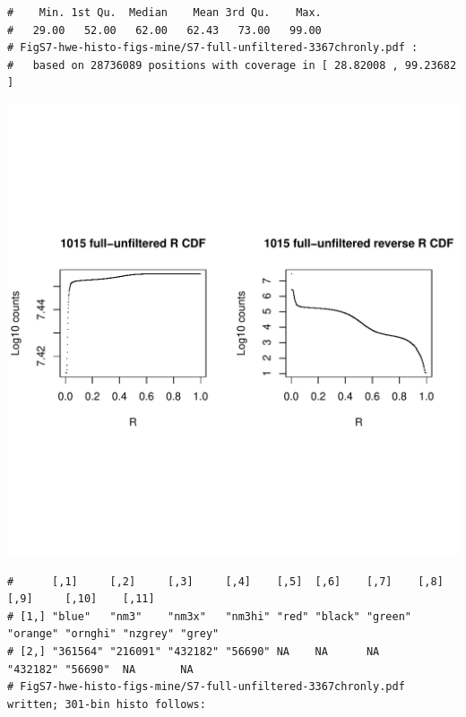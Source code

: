 \documentclass{article}\usepackage[]{graphicx}\usepackage[]{color}
\makeatletter
\def\maxwidth{ %
  \ifdim\Gin@nat@width>\linewidth
    \linewidth
  \else
    \Gin@nat@width
  \fi
}
\newenvironment{kframe}{%
 \def\at@end@of@kframe{}%
 \ifinner\ifhmode%
  \def\at@end@of@kframe{\end{minipage}}%
  \begin{minipage}{\columnwidth}%
 \fi\fi%
 \def\FrameCommand##1{\hskip\@totalleftmargin \hskip-\fboxsep
 \colorbox{shadecolor}{##1}\hskip-\fboxsep
     \hskip-\linewidth \hskip-\@totalleftmargin \hskip\columnwidth}%
 \MakeFramed {\advance\hsize-\width
   \@totalleftmargin\z@ \linewidth\hsize
   \@setminipage}}%
 {\par\unskip\endMakeFramed%
 \at@end@of@kframe}
\newenvironment{knitrout}{}{} %
\makeatother
\begin{document}
\begin{knitrout}
\begin{kframe}
\begin{verbatim}
#    Min. 1st Qu.  Median    Mean 3rd Qu.    Max. 
#   29.00   52.00   62.00   62.43   73.00   99.00 
# FigS7-hwe-histo-figs-mine/S7-full-unfiltered-3367chronly.pdf :
#   based on 28736089 positions with coverage in [ 28.82008 , 99.23682 ]
\end{verbatim}
\end{kframe}
\includegraphics[width=\maxwidth]{FigS7-hwe-histo-figs-knitr/unnamed-chunk-10-10} 
\begin{kframe}\begin{verbatim}
#      [,1]     [,2]     [,3]     [,4]    [,5]  [,6]    [,7]    [,8]     [,9]     [,10]    [,11] 
# [1,] "blue"   "nm3"    "nm3x"   "nm3hi" "red" "black" "green" "orange" "ornghi" "nzgrey" "grey"
# [2,] "361564" "216091" "432182" "56690" NA    NA      NA      "432182" "56690"  NA       NA    
# FigS7-hwe-histo-figs-mine/S7-full-unfiltered-3367chronly.pdf written; 301-bin histo follows:
\end{verbatim}
\end{kframe}

\end{knitrout}
\end{document}
